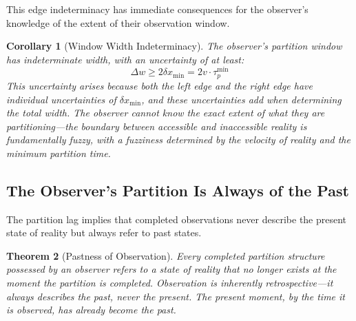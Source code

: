 \documentclass[12pt,a4paper]{article}
\newtheorem{theorem}{Theorem}[section]
\newtheorem{corollary}[theorem]{Corollary}
\theoremstyle{definition}
\theoremstyle{remark}
\begin{document}
This edge indeterminacy has immediate consequences for the observer's knowledge of the extent of their observation window.

\begin{corollary}[Window Width Indeterminacy]
\label{cor:window_width}
The observer's partition window has indeterminate width, with an uncertainty of at least:
\begin{equation}
    \Delta w \geq 2 \delta x_{\min} = 2 v \cdot \tau_p^{\min}
\end{equation}
This uncertainty arises because both the left edge and the right edge have individual uncertainties of $\delta x_{\min}$, and these uncertainties add when determining the total width. The observer cannot know the exact extent of what they are partitioning—the boundary between accessible and inaccessible reality is fundamentally fuzzy, with a fuzziness determined by the velocity of reality and the minimum partition time.
\end{corollary}

\subsection{The Observer's Partition Is Always of the Past}

The partition lag implies that completed observations never describe the present state of reality but always refer to past states.

\begin{theorem}[Pastness of Observation]
\label{thm:pastness}
Every completed partition structure possessed by an observer refers to a state of reality that no longer exists at the moment the partition is completed. Observation is inherently retrospective—it always describes the past, never the present. The present moment, by the time it is observed, has already become the past.
\end{theorem}
\end{document}

